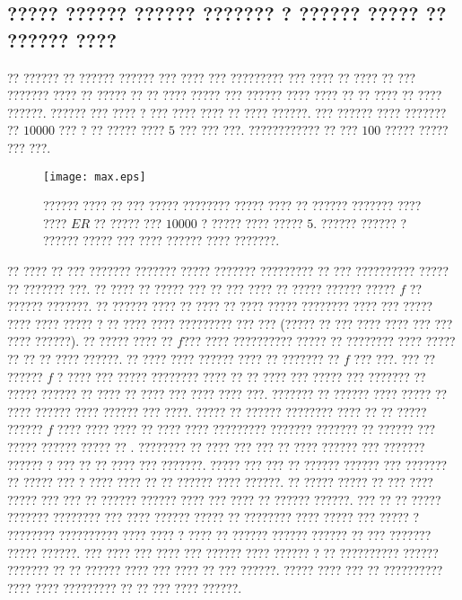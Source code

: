 \subsection{????? ?????? ?????? ??????? ? ?????? ????? ?? ?????? ????}
?? ?????? ?? ?????? ?????? ??? ???? ??? ????????? ??? ????  ?? ???? ?? ??? ??????? ???? ?? ????? ?? ?? ???? ????? ??? ?????? ???? ???? ?? ?? ???? ?? ???? ??????. ?????? ??? ???? ? ??? ???? ???? ?? ???? ??????. ??? ?????? ???? ??????? ?? $10000$ ??? ? ?? ????? ???? $5$ ??? ??? ???.  ???????????? ?? ???  $100$ ????? ????? ??? ???.
\begin{figure} [htbp]
\centering
\texttt{[image: max.eps]} 
\caption [?????? ???? ?? ??? ????? ???????? ????? ???? ?? ?????? ??????? ???? ???? $ER$]{\footnotesize ?????? ???? ?? ??? ????? ???????? ????? ???? ?? ?????? ??????? ???? ???? $ER$ ?? ????? ??? $10000$ ? ????? ???? ????? $5$. ?????? ?????? ? ?????? ????? ??? ???? ?????? ???? ???????.}
\label{fig:max}
\end{figure}

?? ???? ?? ??? ??????? ??????? ????? ??????? ????????? ?? ??? ?????????? ????? ?? ??????? ???. ?? ???? ?? ????? ??? ?? ??? ???? ?? ????? ?????? ????? $f$ ?? ?????? ???????. ?? ?????? ???? ?? ???? ?? ???? ????? ???????? ???? ??? ????? ???? ???? ????? ? ?? ???? ???? ????????? ??? ??? (????? ?? ??? ???? ????  ??? ??? ???? ??????). ?? ????? ???? ?? $f$??? ???? ?????????? ????? ?? ???????? ???? ????? ?? ?? ?? ???? ??????. ?? ???? ???? ?????? ???? ?? ??????? ?? $f$ ??? ???. ??? ?? ?????? $f$ ? ???? ??? ????? ???????? ???? ?? ?? ???? ???  ????? ??? ??????? ?? ????? ?????? ?? ???? ?? ???? ??? ???? ????  ???. ??????? ?? ?????? ???? ????? ?? ???? ?????? ???? ?????? ??? ????. ????? ?? ?????? ???????? ???? ?? ?? ????? ?????? $f$ ???? ????  ???? ?? ???? ???? ????????? ??????? ??????? ??  ?????? ??? ????? ?????? ????? ?? . ???????? ?? ???? ??? ??? ?? ???? ??????  ??? ??????? ?????? ? ??? ?? ?? ???? ??? ???????. ????? ??? ??? ?? ?????? ?????? ??? ??????? ?? ????? ??? ? ???? ???? ?? ?? ?????? ???? ??????. ?? ????? ????? ?? ??? ???? ????? ??? ??? ?? ?????? ?????? ???? ??? ???? ?? ?????? ??????. ??? ?? ?? ????? ??????? ???????? ??? ???? ?????? ????? ?? ???????? ???? ????? ??? ????? ? ???????? ?????????? ???? ???? ? ???? ?? ?????? ?????? ?????? ?? ??? ??????? ????? ??????. ??? ???? ??? ???? ??? ?????? ???? ?????? ? ?? ?????????? ?????? ??????? ?? ?? ?????? ???? ??? ???? ?? ??? ??????. ????? ???? ??? ?? ?????????? ???? ???? ????????? ?? ?? ??? ???? ??????.

